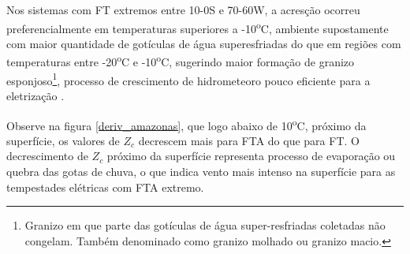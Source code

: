 Nos sistemas com FT extremos entre 10-0S e 70-60W, a acresção ocorreu preferencialmente em temperaturas superiores a -10\textsuperscript{o}C, ambiente supostamente com maior quantidade de gotículas de água superesfriadas do que em regiões com temperaturas entre -20\textsuperscript{o}C e -10\textsuperscript{o}C, sugerindo maior formação de granizo esponjoso\footnote{Granizo em que parte das gotículas de água super-resfriadas coletadas não congelam. Também denominado como granizo molhado ou granizo macio.}, processo de crescimento de hidrometeoro pouco eficiente para a eletrização \cite{jayaratne1983}. 



Observe na figura \ref{deriv_amazonas}, que logo abaixo de 10\textsuperscript{o}C, próximo da superfície, os valores de $Z_c$ decrescem mais para FTA do que para FT. O decrescimento de $Z_c$ próximo da superfície representa processo de evaporação ou quebra das gotas de chuva, o que indica vento mais intenso na superfície para as tempestades elétricas com FTA extremo. 



